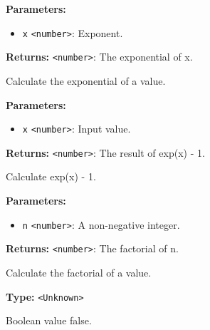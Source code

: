 \documentclass[12pt,a4paper]{article}
\begin{document}
\vspace{5mm}
\noindent {}


\noindent \textbf{Parameters:}
\begin{itemize}
  \item \texttt{x} \texttt{<number>}: Exponent.
\end{itemize}

\noindent \textbf{Returns:} \texttt{<number>}: The exponential of x.

\noindent Calculate the exponential of a value.

\vspace{5mm}
\noindent {}


\noindent \textbf{Parameters:}
\begin{itemize}
  \item \texttt{x} \texttt{<number>}: Input value.
\end{itemize}

\noindent \textbf{Returns:} \texttt{<number>}: The result of exp(x) - 1.

\noindent Calculate exp(x) - 1.

\vspace{5mm}
\noindent {}


\noindent \textbf{Parameters:}
\begin{itemize}
  \item \texttt{n} \texttt{<number>}: A non-negative integer.
\end{itemize}

\noindent \textbf{Returns:} \texttt{<number>}: The factorial of n.

\noindent Calculate the factorial of a value.

\vspace{5mm}
\noindent {}\vspace{4mm}


\noindent \textbf{Type:} \texttt{<Unknown>}

\noindent Boolean value false.
\end{document}
